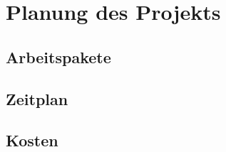 \chapter{Planung des Projekts}
\label{cha:Planung}

\section{Arbeitspakete}

\section{Zeitplan}

\section{Kosten}